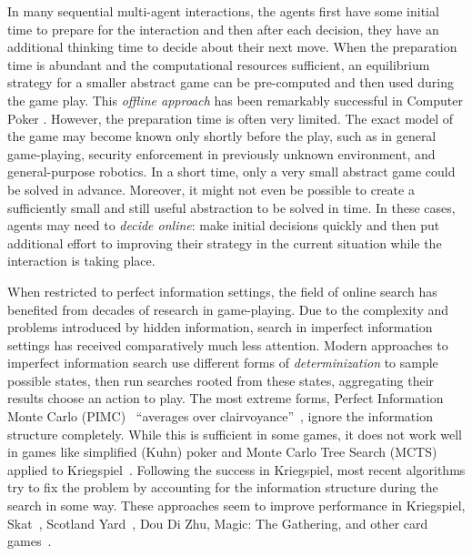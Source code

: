 \documentclass[letterpaper]{article}
\begin{document}
In many sequential multi-agent interactions, the agents first have some initial time to prepare for the interaction and then after each decision, they have an additional thinking time to decide about their next move. When the preparation time is abundant and the computational resources sufficient, an equilibrium strategy for a smaller abstract game can be pre-computed and then used during the game play. This {\it offline approach} has been remarkably successful in Computer Poker \cite{}.
However, the preparation time is often very limited. The exact model of the game may become known only shortly before the play, such as in general game-playing, security enforcement in previously unknown environment, and general-purpose robotics. In a short time, only a very small abstract game could be solved in advance. Moreover, it might not even be possible to create a sufficiently small and still useful abstraction to be solved in time. In these cases, agents may need to {\it decide online}: make initial decisions quickly and then put additional effort to improving their strategy in the current situation while the interaction is taking place.

When restricted to perfect information settings, the field of online search has benefited from decades of research in game-playing. 
Due to the complexity and problems introduced by hidden information, search in imperfect information settings has received comparatively much less attention.
Modern approaches to imperfect information search use different forms of {\it determinization} to sample possible states, then run 
searches rooted from these states, aggregating their results choose an action to play. The most extreme forms, Perfect Information Monte Carlo (PIMC)~\cite{Long10Understanding} ``averages over clairvoyance''~\cite{AIBook},
ignore the information structure completely. While this is sufficient in some games, it does not work well in games like simplified (Kuhn) poker and 
Monte Carlo Tree Search (MCTS) applied to Kriegspiel~\cite{Ciancarini10Kriegspiel}. 
Following the success in Kriegspiel, most recent algorithms try to fix the problem by accounting for the information structure during the 
search in some way. These approaches seem to improve performance in Kriegspiel, Skat~\cite{Furtak13Recursive}, 
Scotland Yard~\cite{Nijssen12SY}, Dou Di Zhu, Magic: The Gathering, and other card games~\cite{Cowling12MTG,Cowling12ISMCTS}.
\end{document}
